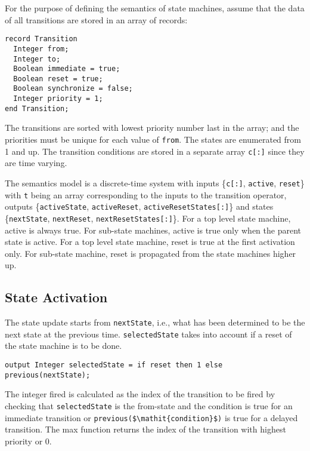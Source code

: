 For the purpose of defining the semantics of state machines, assume that
the data of all transitions are stored in an array of records:
\begin{lstlisting}[language=modelica]
record Transition
  Integer from;
  Integer to;
  Boolean immediate = true;
  Boolean reset = true;
  Boolean synchronize = false;
  Integer priority = 1;
end Transition;
\end{lstlisting}

The transitions are sorted with lowest priority number last in the
array; and the priorities must be unique for each value of \lstinline!from!. The
states are enumerated from 1 and up. The transition conditions are
stored in a separate array \lstinline!c[:]! since they are time varying.

The semantics model is a discrete-time system with inputs \{\lstinline!c[:]!,
\lstinline!active!, \lstinline!reset!\} with \lstinline!t! being an array corresponding to the inputs to the
transition operator, outputs \{\lstinline!activeState!, \lstinline!activeReset!,
\lstinline!activeResetStates[:]!\} and states \{\lstinline!nextState!, \lstinline!nextReset!,
\lstinline!nextResetStates[:]!\}. For a top level state machine, active is
always true. For sub-state machines, active is true only when the parent
state is active. For a top level state machine, reset is true at the
first activation only. For sub-state machine, reset is propagated from
the state machines higher up.

\subsection{State Activation}\label{state-activation}

The state update starts from \lstinline!nextState!, i.e., what has been determined to be the next state at the previous time.
\lstinline!selectedState! takes into account if a reset of the state machine is to be done.

\begin{lstlisting}[language=modelica]
output Integer selectedState = if reset then 1 else previous(nextState);
\end{lstlisting}
The integer fired is calculated as the index of the transition to be fired by checking that \lstinline!selectedState! is the from-state and the condition is true for an immediate transition or \lstinline!previous($\mathit{condition}$)! is true for a delayed transition.  The max function returns the index of the transition with highest priority or 0.

